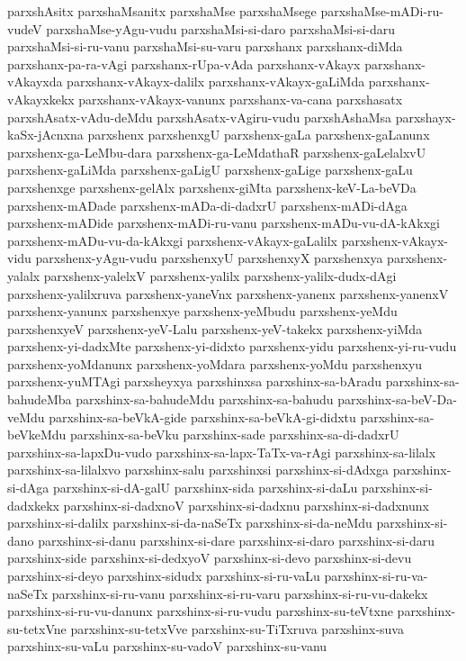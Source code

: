 {parxshAsitx
parxshaMsanitx
parxshaMse
parxshaMsege
parxshaMse-mADi-ru-vudeV
parxshaMse-yAgu-vudu
parxshaMsi-si-daro
parxshaMsi-si-daru
parxshaMsi-si-ru-vanu
parxshaMsi-su-varu
parxshanx
parxshanx-diMda
parxshanx-pa-ra-vAgi
parxshanx-rUpa-vAda
parxshanx-vAkayx
parxshanx-vAkayxda
parxshanx-vAkayx-dalilx
parxshanx-vAkayx-gaLiMda
parxshanx-vAkayxkekx
parxshanx-vAkayx-vanunx
parxshanx-va-cana
parxshasatx
parxshAsatx-vAdu-deMdu
parxshAsatx-vAgiru-vudu
parxshAshaMsa
parxshayx-kaSx-jAcnxna
parxshenx
parxshenxgU
parxshenx-gaLa
parxshenx-gaLanunx
parxshenx-ga-LeMbu-dara
parxshenx-ga-LeMdathaR
parxshenx-gaLelalxvU
parxshenx-gaLiMda
parxshenx-gaLigU
parxshenx-gaLige
parxshenx-gaLu
parxshenxge
parxshenx-gelAlx
parxshenx-giMta
parxshenx-keV-La-beVDa
parxshenx-mADade
parxshenx-mADa-di-dadxrU
parxshenx-mADi-dAga
parxshenx-mADide
parxshenx-mADi-ru-vanu
parxshenx-mADu-vu-dA-kAkxgi
parxshenx-mADu-vu-da-kAkxgi
parxshenx-vAkayx-gaLalilx
parxshenx-vAkayx-vidu
parxshenx-yAgu-vudu
parxshenxyU
parxshenxyX
parxshenxya
parxshenx-yalalx
parxshenx-yalelxV
parxshenx-yalilx
parxshenx-yalilx-dudx-dAgi
parxshenx-yalilxruva
parxshenx-yaneVnx
parxshenx-yanenx
parxshenx-yanenxV
parxshenx-yanunx
parxshenxye
parxshenx-yeMbudu
parxshenx-yeMdu
parxshenxyeV
parxshenx-yeV-Lalu
parxshenx-yeV-takekx
parxshenx-yiMda
parxshenx-yi-dadxMte
parxshenx-yi-didxto
parxshenx-yidu
parxshenx-yi-ru-vudu
parxshenx-yoMdanunx
parxshenx-yoMdara
parxshenx-yoMdu
parxshenxyu
parxshenx-yuMTAgi
parxsheyxya
parxshinxsa
parxshinx-sa-bAradu
parxshinx-sa-bahudeMba
parxshinx-sa-bahudeMdu
parxshinx-sa-bahudu
parxshinx-sa-beV-Da-veMdu
parxshinx-sa-beVkA-gide
parxshinx-sa-beVkA-gi-didxtu
parxshinx-sa-beVkeMdu
parxshinx-sa-beVku
parxshinx-sade
parxshinx-sa-di-dadxrU
parxshinx-sa-lapxDu-vudo
parxshinx-sa-lapx-TaTx-va-rAgi
parxshinx-sa-lilalx
parxshinx-sa-lilalxvo
parxshinx-salu
parxshinxsi
parxshinx-si-dAdxga
parxshinx-si-dAga
parxshinx-si-dA-galU
parxshinx-sida
parxshinx-si-daLu
parxshinx-si-dadxkekx
parxshinx-si-dadxnoV
parxshinx-si-dadxnu
parxshinx-si-dadxnunx
parxshinx-si-dalilx
parxshinx-si-da-naSeTx
parxshinx-si-da-neMdu
parxshinx-si-dano
parxshinx-si-danu
parxshinx-si-dare
parxshinx-si-daro
parxshinx-si-daru
parxshinx-side
parxshinx-si-dedxyoV
parxshinx-si-devo
parxshinx-si-devu
parxshinx-si-deyo
parxshinx-sidudx
parxshinx-si-ru-vaLu
parxshinx-si-ru-va-naSeTx
parxshinx-si-ru-vanu
parxshinx-si-ru-varu
parxshinx-si-ru-vu-dakekx
parxshinx-si-ru-vu-danunx
parxshinx-si-ru-vudu
parxshinx-su-teVtxne
parxshinx-su-tetxVne
parxshinx-su-tetxVve
parxshinx-su-TiTxruva
parxshinx-suva
parxshinx-su-vaLu
parxshinx-su-vadoV
parxshinx-su-vanu
}
